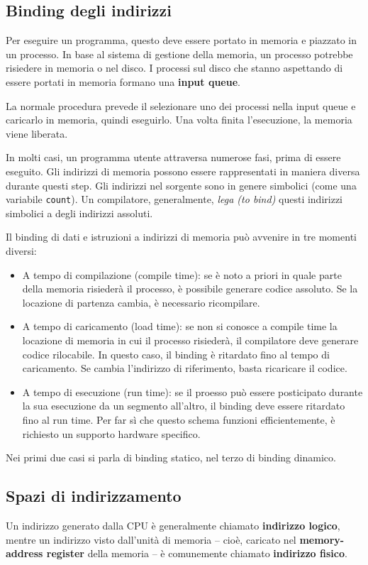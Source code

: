 \documentclass[a4paper]{article}
\begin{document}
\subsection{Binding degli indirizzi}
Per eseguire un programma, questo deve essere portato in memoria e piazzato in un processo. In base al sistema di gestione della memoria, un processo potrebbe risiedere in memoria o nel disco. I processi sul disco che stanno aspettando di essere portati in memoria formano una \textbf{input queue}.

La normale procedura prevede il selezionare uno dei processi nella input queue e caricarlo in memoria, quindi eseguirlo. Una volta finita l'esecuzione, la memoria viene liberata.

In molti casi, un programma utente attraversa numerose fasi, prima di essere eseguito. Gli indirizzi di memoria possono essere rappresentati in maniera diversa durante questi step. \newline
Gli indirizzi nel sorgente sono in genere simbolici (come una variabile \texttt{count}). Un compilatore, generalmente, \textit{lega (to bind)} questi indirizzi simbolici a degli indirizzi assoluti.

Il binding di dati e istruzioni a indirizzi di memoria può avvenire in tre momenti diversi:
\begin{itemize}
    \item A tempo di compilazione (compile time): se è noto a priori in quale parte della memoria risiederà il processo, è possibile generare codice assoluto. Se la locazione di partenza cambia, è necessario ricompilare.
    \item A tempo di caricamento (load time): se non si conosce a compile time la locazione di memoria in cui il processo risiederà, il compilatore deve generare codice rilocabile. In questo caso, il binding è ritardato fino al tempo di caricamento. Se cambia l'indirizzo di riferimento, basta ricaricare il codice.
    \item A tempo di esecuzione (run time): se il proesso può essere posticipato durante la sua esecuzione da un segmento all'altro, il binding deve essere ritardato fino al run time. Per far sì che questo schema funzioni efficientemente, è richiesto un supporto hardware specifico.
\end{itemize}
Nei primi due casi si parla di binding statico, nel terzo di binding dinamico.

\subsection{Spazi di indirizzamento}
Un indirizzo generato dalla CPU è generalmente chiamato \textbf{indirizzo logico}, mentre un indirizzo visto dall'unità di memoria -- cioè, caricato nel \textbf{memory-address register} della memoria -- è comunemente chiamato \textbf{indirizzo fisico}.
\end{document}
